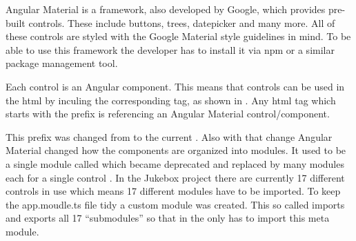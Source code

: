

Angular Material is a framework, also developed by Google, which provides pre-built controls. These include buttons, trees, datepicker and many more. All of these controls are styled with the Google Material style guidelines in mind. To be able to use this framework the developer has to install it via \gls{npm} or a similar package management tool. \cite{angularMaterial}

Each control is an Angular component. This means that controls can be used in the \gls{html} by inculing the corresponding tag, as shown in . Any \gls{html} tag which starts with the  prefix is referencing an Angular Material control/component.

This prefix was changed from  to the current . Also with that change Angular Material changed how the components are organized into modules. It used to be a single module called  which became deprecated and replaced by many modules each for a single control \zB {}. In the Jukebox project there are currently 17 different controls in use which means 17 different modules have to be imported. To keep the app.moudle.ts file tidy a custom module was created. This so called  imports and exports all 17 \enquote{submodules} so that in the  only has to import this meta module.

